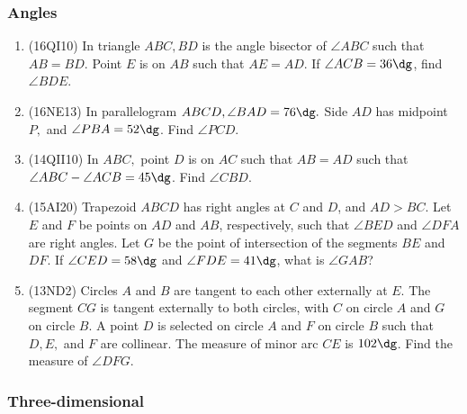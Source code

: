 \documentclass[10pt,paper=letter]{scrartcl}
\begin{document}
\subsubsection*{Angles}

\begin{enumerate}

\item (16QI10) In triangle $ABC, BD$ is the angle bisector of $\angle ABC$ such that $AB = BD$. Point $E$ is on $AB$ such that $AE = AD$. If $\angle ACB = 36\dg$, find $\angle BDE$.

\item (16NE13) In parallelogram $ABCD, \angle BAD = 76\dg.$ Side $AD$ has midpoint $P,$ and $\angle PBA = 52\dg$. Find $\angle PCD$.

\item (14QII10) In $ABC,$ point $D$ is on $AC$ such that $AB = AD$ such that $\angle ABC - \angle ACB = 45\dg$. Find $\angle CBD$.

\item (15AI20) Trapezoid $ABCD$ has right angles at $C$ and $D$, and $AD > BC$. Let $E$ and $F$ be points on $AD$ and $AB$, respectively, such that $\angle BED$ and $\angle DFA$ are right angles. Let $G$ be the point of intersection of the segments $BE$ and $DF$. If $\angle CED = 58\dg$ and $\angle FDE = 41\dg$, what is $\angle GAB$?

\item (13ND2) Circles $A$ and $B$ are tangent to each other externally at $E$. The segment $CG$ is tangent externally to both circles, with $C$ on circle $A$ and $G$ on circle $B$. A point $D$ is selected on circle $A$ and $F$ on circle $B$ such that $D, E,$ and $F$ are collinear. The measure of minor arc $CE$ is $102\dg$. Find the measure of $\angle DFG$.

\end{enumerate}

\subsubsection*{Three-dimensional}
\end{document}
